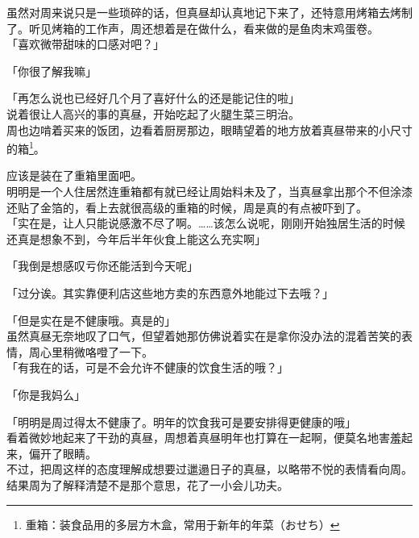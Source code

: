 虽然对周来说只是一些琐碎的话，但真昼却认真地记下来了，还特意用烤箱去烤制了。听见烤箱的工作声，周还想着是在做什么，看来做的是鱼肉末鸡蛋卷。\\

「喜欢微带甜味的口感对吧？」

「你很了解我嘛」

「再怎么说也已经好几个月了喜好什么的还是能记住的啦」\\

说着很让人高兴的事的真昼，开始吃起了火腿生菜三明治。\\

周也边啃着买来的饭团，边看着厨房那边，眼睛望着的地方放着真昼带来的小尺寸的箱\footnote{重箱：装食品用的多层方木盒，常用于新年的年菜（{\jpfont おせち}）}。

应该是装在了重箱里面吧。\\

明明是一个人住居然连重箱都有就已经让周始料未及了，当真昼拿出那个不但涂漆还贴了金箔的，看上去就很高级的重箱的时候，周是真的有点被吓到了。\\

「实在是，让人只能说感激不尽了啊。……该怎么说呢，刚刚开始独居生活的时候还真是想象不到，今年后半年伙食上能这么充实啊」

「我倒是想感叹亏你还能活到今天呢」

「过分诶。其实靠便利店这些地方卖的东西意外地能过下去哦？」

「但是实在是不健康哦。真是的」\\

虽然真昼无奈地叹了口气，但望着她那仿佛说着实在是拿你没办法的混着苦笑的表情，周心里稍微咯噔了一下。\\

「有我在的话，可是不会允许不健康的饮食生活的哦？」

「你是我妈么」

「明明是周过得太不健康了。明年的饮食我可是要安排得更健康的哦」\\

看着微妙地起来了干劲的真昼，周想着真昼明年也打算在一起啊，便莫名地害羞起来，偏开了眼睛。\\

不过，把周这样的态度理解成想要过邋遢日子的真昼，以略带不悦的表情看向周。结果周为了解释清楚不是那个意思，花了一小会儿功夫。
